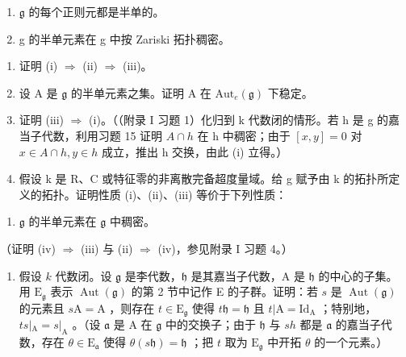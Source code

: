 \begin{enumerate}
\def\labelenumi{(\roman{enumi})}
\setcounter{enumi}{1}
\item
  \(\mathfrak{g}\) 的每个正则元都是半单的。
\item
  g 的半单元素在 g 中按 Zariski 拓扑稠密。
\end{enumerate}

\begin{enumerate}
\def\labelenumi{\alph{enumi})}
\item
  证明 (i) \(\Longrightarrow\) (ii) \(\Longrightarrow\) (iii)。
\item
  设 A 是 \(\mathfrak{g}\) 的半单元素之集。证明 A 在 \(\mathrm{Aut}_e(\mathfrak{g})\) 下稳定。
\item
  证明 (iii) \(\Longrightarrow\) (i)。（（附录 I 习题 1）化归到 k 代数闭的情形。若 h 是 g 的嘉当子代数，利用习题 15 证明 \(A \cap h\) 在 h 中稠密；由于 \([x, y] = 0\) 对 \(x \in A \cap h, y \in h\) 成立，推出 h 交换，由此 (i) 立得。）
\item
  假设 k 是 R、C 或特征零的非离散完备超度量域。给 g 赋予由 k 的拓扑所定义的拓扑。证明性质 (i)、(ii)、(iii) 等价于下列性质：
\end{enumerate}

\begin{enumerate}
\def\labelenumi{(\roman{enumi})}
\setcounter{enumi}{3}
\tightlist
\item
  \(\mathfrak{g}\) 的半单元素在 \(\mathfrak{g}\) 中稠密。
\end{enumerate}

（证明 (iv) \(\Longrightarrow\) (iii) 与 (ii) \(\Longrightarrow\) (iv)，参见附录 I 习题 4。）

\begin{enumerate}
\def\labelenumi{\arabic{enumi})}
\setcounter{enumi}{16}
\tightlist
\item
  假设 \(k\) 代数闭。设 \(\mathfrak{g}\) 是李代数，\(\mathfrak{h}\) 是其嘉当子代数，A 是 \(\mathfrak{h}\) 的中心的子集。用 \(\mathrm{E}_{\mathfrak{g}}\) 表示 \(\operatorname{Aut}(\mathfrak{g})\) 的第 2 节中记作 E 的子群。证明：若 \(s\) 是 \(\operatorname{Aut}(\mathfrak{g})\) 的元素且 \(s\mathrm{A} = \mathrm{A}\) ，则存在 \(t \in \mathrm{E}_{\mathfrak{g}}\) 使得 \(t\mathfrak{h} = \mathfrak{h}\) 且 \(t|\mathrm{A} = \mathrm{Id}_{\mathrm{A}}\) ；特别地，\(ts|_{\mathrm{A}} = s|_{\mathrm{A}}\) 。（设 \(\mathfrak{a}\) 是 A 在 \(\mathfrak{g}\) 中的交换子；由于 \(\mathfrak{h}\) 与 \(sh\) 都是 \(\mathfrak{a}\) 的嘉当子代数，存在 \(\theta \in \mathrm{E}_{\mathfrak{a}}\) 使得 \(\theta(s\mathfrak{h}) = \mathfrak{h}\) ；把 \(t\) 取为 \(\mathrm{E}_{\mathfrak{g}}\) 中开拓 \(\theta\) 的一个元素。）
\end{enumerate}

